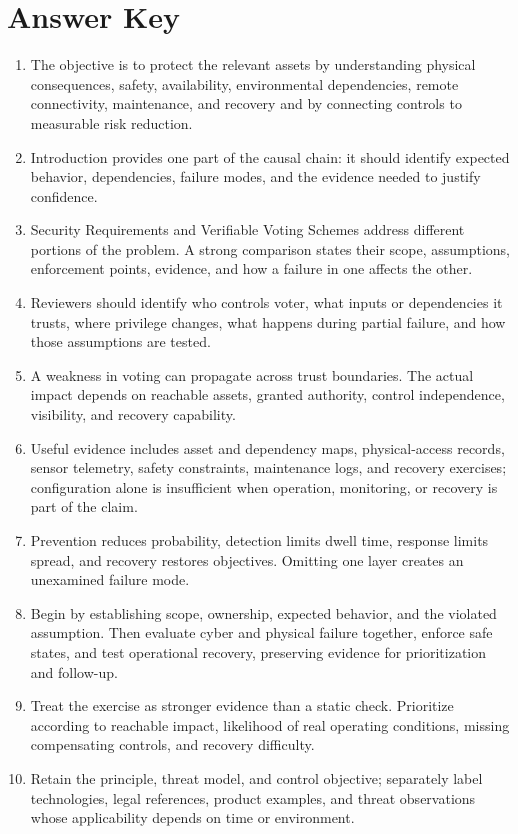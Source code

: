 \documentclass[11pt,letterpaper]{article}
\begin{document}
\section*{Answer Key}
\begin{enumerate}
\item The objective is to protect the relevant assets by understanding physical consequences, safety, availability, environmental dependencies, remote connectivity, maintenance, and recovery and by connecting controls to measurable risk reduction.
\item Introduction provides one part of the causal chain: it should identify expected behavior, dependencies, failure modes, and the evidence needed to justify confidence.
\item Security Requirements and Verifiable Voting Schemes address different portions of the problem. A strong comparison states their scope, assumptions, enforcement points, evidence, and how a failure in one affects the other.
\item Reviewers should identify who controls voter, what inputs or dependencies it trusts, where privilege changes, what happens during partial failure, and how those assumptions are tested.
\item A weakness in voting can propagate across trust boundaries. The actual impact depends on reachable assets, granted authority, control independence, visibility, and recovery capability.
\item Useful evidence includes asset and dependency maps, physical-access records, sensor telemetry, safety constraints, maintenance logs, and recovery exercises; configuration alone is insufficient when operation, monitoring, or recovery is part of the claim.
\item Prevention reduces probability, detection limits dwell time, response limits spread, and recovery restores objectives. Omitting one layer creates an unexamined failure mode.
\item Begin by establishing scope, ownership, expected behavior, and the violated assumption. Then evaluate cyber and physical failure together, enforce safe states, and test operational recovery, preserving evidence for prioritization and follow-up.
\item Treat the exercise as stronger evidence than a static check. Prioritize according to reachable impact, likelihood of real operating conditions, missing compensating controls, and recovery difficulty.
\item Retain the principle, threat model, and control objective; separately label technologies, legal references, product examples, and threat observations whose applicability depends on time or environment.
\end{enumerate}
\end{document}
